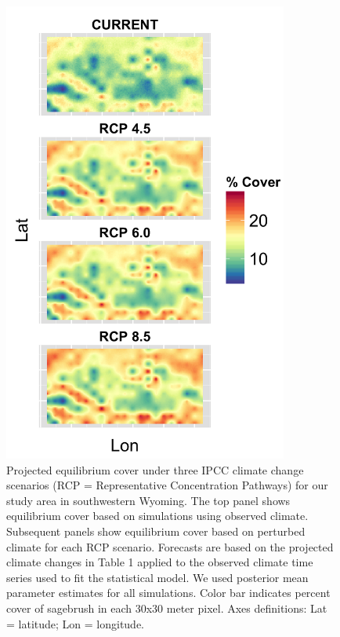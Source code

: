 \documentclass[12pt,]{article}
\begin{document}
\begin{figure}[!ht]
  \centering
      \includegraphics[height=6in]{../figures/clim_change_mean_spatial.png}
  \caption{Projected equilibrium cover under three IPCC climate change scenarios (RCP = Representative Concentration Pathways) for our study area in southwestern Wyoming. The top panel shows equilibrium cover based on simulations using observed climate. Subsequent panels show equilibrium cover based on perturbed climate for each RCP scenario. Forecasts are based on the projected climate changes in Table 1 applied to the observed climate time series used to fit the statistical model. We used posterior mean parameter estimates for all simulations. Color bar indicates percent cover of sagebrush in each 30x30 meter pixel. Axes definitions: Lat = latitude; Lon = longitude.}
\end{figure}

\newpage{}
\end{document}
